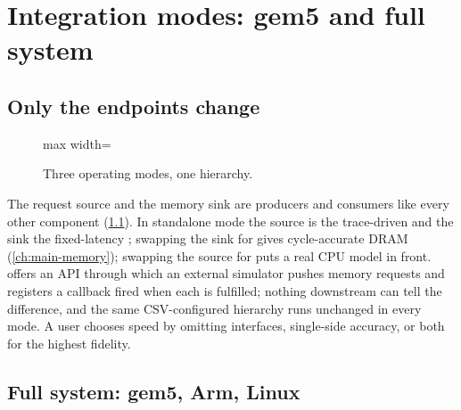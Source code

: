 \chapter[Integration modes]{Integration modes: gem5 and full system}\label{ch:integration-modes}


\section{Only the endpoints change}

\begin{figure}[htbp]\centering
\begin{adjustbox}{max width=\textwidth}\end{adjustbox}
\caption{Three operating modes, one hierarchy.}
\label{fig:operating-modes}
\end{figure}

The request source and the memory sink are  producers and
consumers like every other component (\cref{fig:operating-modes}). In standalone mode the
source is the trace-driven  and the sink the fixed-latency
; swapping the sink for  gives cycle-accurate
DRAM (\cref{ch:main-memory}); swapping the source for  puts a real CPU model
in front.  offers an API through which an external simulator pushes memory
requests and registers a callback fired when each is fulfilled; nothing downstream can tell the
difference, and the same CSV-configured hierarchy runs unchanged in every mode. A user chooses
speed by omitting interfaces, single-side accuracy, or both for the highest fidelity.

\section{Full system: gem5, Arm, Linux}


